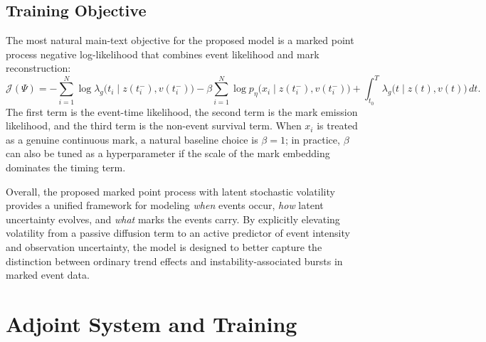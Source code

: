 \documentclass[11pt]{article}
\theoremstyle{definition}
\numberwithin{equation}{section}
\numberwithin{theorem}{section}
\numberwithin{proposition}{section}
\numberwithin{lemma}{section}
\numberwithin{corollary}{section}
\numberwithin{definition}{section}
\numberwithin{remark}{section}
\newcommand{\1}{\mathbbm{1}}
\begin{document}
\subsection{Training Objective}

The most natural main-text objective for the proposed model is a marked point process negative log-likelihood that combines event likelihood and mark reconstruction:
\begin{equation}
\label{eq:elbo}
\mathcal{J}(\Psi)
=
-
\sum_{i=1}^{N} \log \lambda_g\bigl(t_i \mid z(t_i^-), v(t_i^-)\bigr)
-
\beta \sum_{i=1}^{N} \log p_{\eta}\bigl(x_i \mid z(t_i^-), v(t_i^-)\bigr)
+
\int_{t_0}^{T} \lambda_g\bigl(t \mid z(t), v(t)\bigr)\,dt.
\end{equation}
The first term is the event-time likelihood, the second term is the mark emission likelihood, and the third term is the non-event survival term. 
When $x_i$ is treated as a genuine continuous mark, a natural baseline choice is $\beta=1$; in practice, $\beta$ can also be tuned as a hyperparameter if the scale of the mark embedding dominates the timing term.

Overall, the proposed marked point process with latent stochastic volatility provides a unified framework for modeling \emph{when} events occur, \emph{how} latent uncertainty evolves, and \emph{what} marks the events carry. 
By explicitly elevating volatility from a passive diffusion term to an active predictor of event intensity and observation uncertainty, the model is designed to better capture the distinction between ordinary trend effects and instability-associated bursts in marked event data.

\section{Adjoint System and Training}
\end{document}
